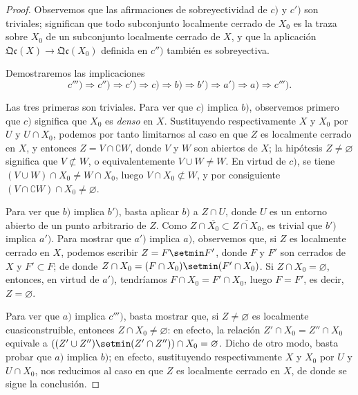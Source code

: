 \begin{proof}
Observemos que las afirmaciones de sobreyectividad de $c)$ y $c')$ son triviales; significan que todo subconjunto localmente cerrado de $X_0$ es la traza sobre $X_0$ de un subconjunto localmente cerrado de $X$, y que la aplicación $\mathfrak{Qc}(X)\to\mathfrak{Qc}(X_0)$ definida en $c'')$ también es sobreyectiva.

Demostraremos las implicaciones
\[
  c''')\Rightarrow c'')\Rightarrow c')\Rightarrow c)\Rightarrow b)\Rightarrow b')\Rightarrow a')\Rightarrow a)\Rightarrow c''').
\]

Las tres primeras son triviales.
Para ver que $c)$ implica $b)$, observemos primero que $c)$ significa que $X_0$ es \emph{denso} en $X$.
Sustituyendo respectivamente $X$ y $X_0$ por $U$ y $U\cap X_0$, podemos por tanto limitarnos al caso en que $Z$ es localmente cerrado en $X$, y entonces $Z=V\cap\complement W$, donde $V$ y $W$ son abiertos de $X$; la hipótesis $Z\neq\varnothing$ significa que $V\not\subset W$, o equivalentemente $V\cup W\neq W$.
En virtud de $c)$, se tiene $(V\cup W)\cap X_0\neq W\cap X_0$, luego $V\cap X_0\not\subset W$, y por consiguiente $(V\cap\complement W)\cap X_0\neq\varnothing$.

Para ver que $b)$ implica $b')$, basta aplicar $b)$ a $Z\cap U$, donde $U$ es un entorno abierto de un punto arbitrario de $Z$.
Como $Z\cap\overline{X_0}\subset\overline{Z\cap X_0}$, es trivial que $b')$ implica $a')$.
Para mostrar que $a')$ implica $a)$, observemos que, si $Z$ es localmente cerrado en $X$, podemos escribir $Z=F\setmin F'$, donde $F$ y $F'$ son cerrados de $X$ y $F'\subset F$; de donde $Z\cap X_0=(F\cap X_0)\setmin(F'\cap X_0)$.
Si $Z\cap X_0=\varnothing$, entonces, en virtud de $a')$, tendríamos $F\cap X_0=F'\cap X_0$, luego $F=F'$, es decir, $Z=\varnothing$.

Para ver que $a)$ implica $c''')$, basta mostrar que, si $Z\neq\varnothing$ es localmente cuasiconstruible, entonces $Z\cap X_0\neq\varnothing$: en efecto, la relación $Z'\cap X_0=Z''\cap X_0$ equivale a $((Z'\cup Z'')\setmin(Z'\cap Z''))\cap X_0=\varnothing$.
Dicho de otro modo, basta probar que $a)$ implica $b)$; en efecto, sustituyendo respectivamente $X$ y $X_0$ por $U$ y $U\cap X_0$, nos reducimos al caso en que $Z$ es localmente cerrado en $X$, de donde se sigue la conclusión.


\end{proof}
